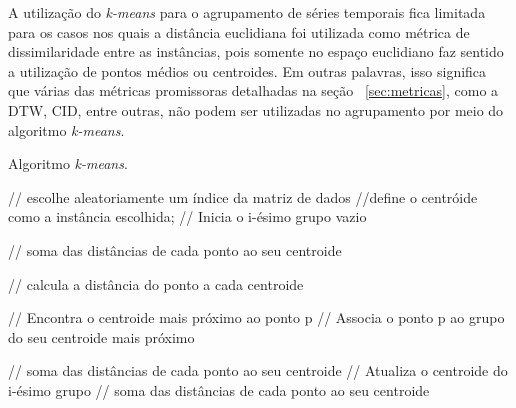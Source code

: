 A utilização do \emph{k-means} para o agrupamento de séries temporais fica limitada para os casos nos quais a distância euclidiana foi utilizada como métrica de dissimilaridade entre as instâncias, pois somente no espaço euclidiano faz sentido a utilização de pontos médios ou centroides. Em outras palavras, isso significa que várias das métricas promissoras detalhadas na seção ~\ref{sec:metricas}, como a DTW, CID, entre outras, não podem ser utilizadas no agrupamento por meio do algoritmo \emph{k-means}.

\begin{algorithm}
	\caption{Algoritmo \emph{k-means}.}
	\label{alg:k_means}
	\begin{algorithmic}[1]
	
		 // escolhe aleatoriamente um índice da matriz de dados
		 //define o centróide como a instância escolhida;
		 // Inicia o i-ésimo grupo vazio
	\ENDFOR
	
	\STATE{$\phi \leftarrow \epsilon $}	// soma das distâncias de cada ponto ao seu centroide

	\WHILE{$\phi \geq \epsilon$}	
						 // calcula a distância do ponto a cada centroide
				\ENDFOR
			
					// Encontra o centroide mais próximo ao ponto p
				 // Associa o ponto p ao grupo do seu centroide mais próximo			
		\ENDFOR

			// soma das distâncias de cada ponto ao seu centroide
			 // Atualiza o centroide do i-ésimo grupo
						// soma das distâncias de cada ponto ao seu centroide
				\ENDIF
			\ENDFOR
		\ENDFOR
		
	\ENDWHILE
		
	\end{algorithmic}
\end{algorithm}

